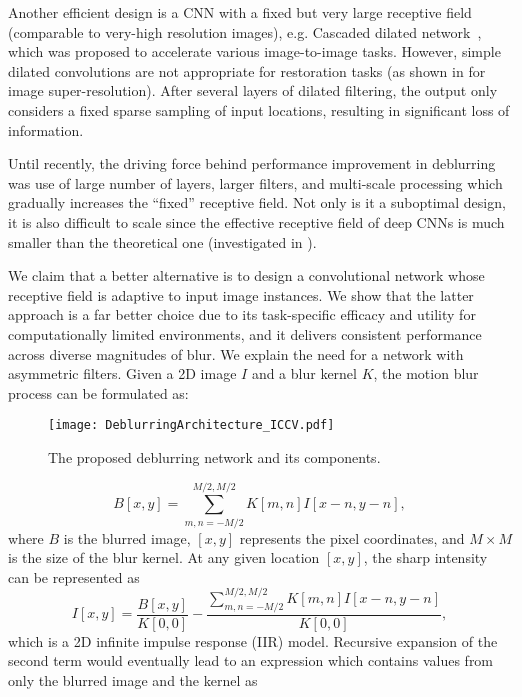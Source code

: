 \documentclass[10pt,twocolumn,letterpaper]{article}
\begin{document}
Another efficient design is a CNN with a fixed but very large receptive field (comparable to very-high resolution images), e.g. Cascaded dilated network~\cite{chen2017fast}, which was proposed to accelerate various image-to-image tasks. However, simple dilated convolutions are not appropriate for restoration tasks (as shown in \cite{liu2018multi} for image super-resolution). After several layers of dilated filtering, the output only considers a fixed sparse sampling of input locations, resulting in significant loss of information. 

Until recently, the driving force behind performance improvement in deblurring was use of large number of layers, larger filters, and multi-scale processing which gradually increases the ``fixed'' receptive field. Not only is it a suboptimal design, it is also difficult to scale since the effective receptive field of deep CNNs is much smaller than the theoretical one (investigated in \cite{luo2016understanding}).

We claim that a better alternative is to design a convolutional network whose receptive field is adaptive to input image instances. We show that the latter approach is a far better choice due to its task-specific efficacy and utility for computationally limited environments, and it delivers consistent performance across diverse magnitudes of blur. We explain the need for a network with asymmetric filters. Given a 2D image $I$ and a blur kernel $K$, the motion blur process can be formulated as:


\begin{figure}[]
\centering
\texttt{[image: DeblurringArchitecture\_ICCV.pdf]}
\caption{The proposed deblurring network and its components.}
\label{fig:architecture}
\end{figure}

\begin{equation}
B[x,y] = \sum_{m,n=-M/2}^{M/2,M/2} K[m,n]I[x-n,y-n],
\end{equation} 
where $B$ is the blurred image, $[x,y]$ represents the pixel coordinates, and $M\times M$ is the size of the blur kernel. At any given location $[x,y]$, the sharp intensity can be represented as  
\begin{equation}
I[x,y] =\frac{B[x,y]}{K[0,0]}-\frac{\sum_{m,n=-M/2}^{M/2,M/2}K[m,n]I[x-n,y-n]}{K[0,0]},
\end{equation} 
which is a 2D infinite impulse response (IIR) model. Recursive expansion of the second term would eventually lead to an expression which contains values from only the blurred image and the kernel as
\end{document}
